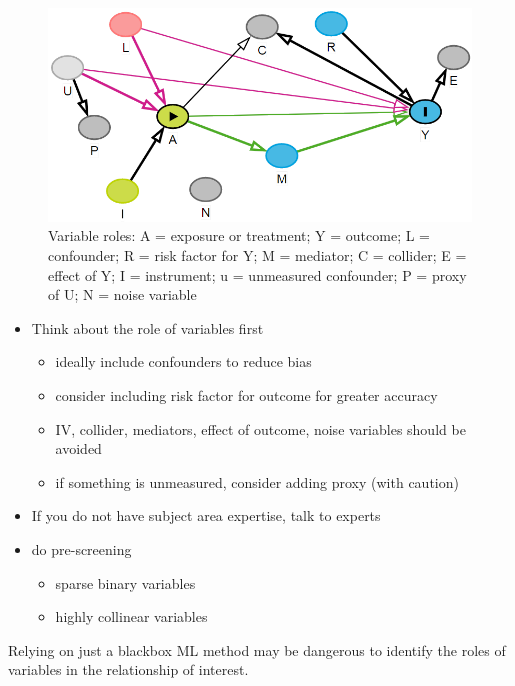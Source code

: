\documentclass[
]{book}
\providecommand{\tightlist}{%
  \setlength{\itemsep}{0pt}\setlength{\parskip}{0pt}}
\begin{document}
\begin{figure}
\includegraphics[width=650px]{images/role} \caption{Variable roles: A = exposure or treatment; Y = outcome; L = confounder; R = risk factor for Y; M = mediator; C = collider; E = effect of Y; I = instrument; u = unmeasured confounder; P = proxy of U; N = noise variable}\label{fig:role}
\end{figure}

\begin{itemize}
\tightlist
\item
  Think about the role of variables first

  \begin{itemize}
  \tightlist
  \item
    ideally include confounders to reduce bias
  \item
    consider including risk factor for outcome for greater accuracy
  \item
    IV, collider, mediators, effect of outcome, noise variables should be avoided
  \item
    if something is unmeasured, consider adding proxy (with caution)
  \end{itemize}
\item
  If you do not have subject area expertise, talk to experts
\item
  do pre-screening

  \begin{itemize}
  \tightlist
  \item
    sparse binary variables
  \item
    highly collinear variables
  \end{itemize}
\end{itemize}

\begin{rmdcomment}
Relying on just a blackbox ML method may be dangerous to identify the
roles of variables in the relationship of interest.
\end{rmdcomment}
\end{document}
